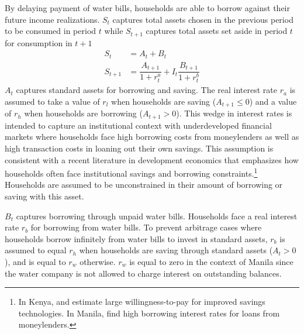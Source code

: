 \documentclass[12pt]{article}
\begin{document}
By delaying payment of water bills, households are able to borrow against their future income realizations.  $S_t$ captures total assets chosen in the previous period to be consumed in period $t$ while $S_{t+1}$ captures total assets set aside in period $t$ for consumption in $t+1$ %
\begin{align}
S_t &= A_t + B_t \\
S_{t+1} &=  \dfrac{A_{t+1}}{1+r^{a}_{t}}  + I_t \dfrac{B_{t+1}}{1+r^{b}_{t}} 
\end{align}
$A_t$ captures standard assets for borrowing and saving.  The real interest rate $r_a$ is assumed to take a value of $r_l$ when households are saving ($A_{t+1} \leq 0$) and a value of $r_h$ when households are borrowing ($A_{t+1} > 0$).  This wedge in interest rates is intended to capture an institutional context with underdeveloped financial markets where households face high borrowing costs from moneylenders as well as high transaction costs in loaning out their own savings.  This assumption is consistent with a recent literature in development economics that emphasizes how households often face institutional savings and borrowing constraints.\footnote{In Kenya, \cite{dupas2013savings} and \cite{dupas2013don} estimate large willingness-to-pay for improved savings technologies.  In Manila, \cite{karlan2009expanding} find high borrowing interest rates for loans from moneylenders.}  Households are assumed to be unconstrained in their amount of borrowing or saving with this asset.  %

$B_t$ captures borrowing through unpaid water bills.  Households face a real interest rate $r_b$ for borrowing from water bills.  To prevent arbitrage cases where households borrow infinitely from water bills to invest in standard assets, $r_b$ is assumed to equal $r_h$ when households are saving through standard assets ($A_t>0$), and is equal to $r_w$ otherwise.  $r_w$ is equal to zero in the context of Manila since the water company is not allowed to charge interest on outstanding balances.%
\end{document}
